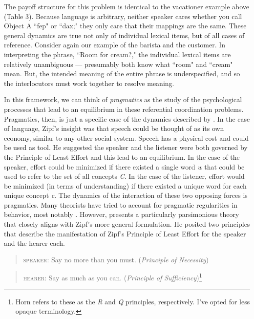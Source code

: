 \documentclass[man, noapacite, 12pt]{apa2}
\begin{document}
The payoff structure for this problem is identical to the vacationer example above (Table 3). Because language is arbitrary, neither speaker cares whether you call Object A ``fep" or ``dax;" they only care that their mappings are the same.  These general dynamics are true not only of individual lexical items, but of all cases of reference. Consider again our example of the barista and the customer. In interpreting the phrase, ``Room for cream?," the individual lexical items are relatively unambiguous --- presumably both know what ``room" and ``cream" mean. But, the intended meaning of the entire phrase is underspecified, and so the interlocutors must work together to resolve meaning.

In this framework, we can think of {\it pragmatics} as the study of the psychological processes that lead to an equilibrium in these referential coordination problems. Pragmatics, then, is just a specific case of the dynamics described by . In the case of language, Zipf's insight was that speech could be thought of as its own economy, similar to any other social system. Speech has a physical cost and could be used as tool. He suggested the speaker and the listener were both governed by the Principle of Least Effort and this lead to an equilibrium. In the case of the speaker, effort could be minimized if there existed a single word {\it w} that could be used to refer to the set of all concepts {\it C}. In the case of the listener, effort would be minimized (in terms of understanding) if there existed a unique word for each  unique concept {\it c}. The dynamics of the interaction of these two opposing forces is pragmatics. 
Many theorists have tried to account for pragmatic regularities in behavior, most notably . However,  presents a particularly parsimonious theory that closely aligns with Zipf's more general formulation. He posited two principles that describe the manifestation of Zipf's Principle of Least Effort for the speaker and the hearer each. 
\begin{quote} \textsc{speaker}: Say no more than you must. ({\it Principle of Necessity}) \end{quote}
\begin{quote} \textsc{hearer}: Say as much as you can. ({\it Principle of Sufficiency})\footnote{Horn refers to these as the {\it R} and {\it Q} principles, respectively. I've opted  for less opaque terminology.} \end{quote}
\end{document}
